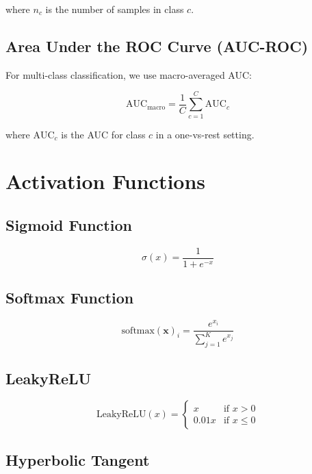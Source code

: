 \documentclass[12pt]{article}
\newcommand{\vecbf}[1]{\mathbf{#1}}
\newcommand{\lrelu}{\text{LeakyReLU}}
\newcommand{\softmax}{\text{softmax}}
\begin{document}
where $n_c$ is the number of samples in class $c$.

\subsection{Area Under the ROC Curve (AUC-ROC)}

For multi-class classification, we use macro-averaged AUC:

\begin{equation}
\text{AUC}_{\text{macro}} = \frac{1}{C} \sum_{c=1}^{C} \text{AUC}_c
\end{equation}

where $\text{AUC}_c$ is the AUC for class $c$ in a one-vs-rest setting.

\section{Activation Functions}

\subsection{Sigmoid Function}

\begin{equation}
\sigma(x) = \frac{1}{1 + e^{-x}}
\end{equation}

\subsection{Softmax Function}

\begin{equation}
\softmax(\vecbf{x})_i = \frac{e^{x_i}}{\sum_{j=1}^{K} e^{x_j}}
\end{equation}

\subsection{LeakyReLU}

\begin{equation}
\lrelu(x) = \begin{cases}
x & \text{if } x > 0 \\
0.01x & \text{if } x \leq 0
\end{cases}
\end{equation}

\subsection{Hyperbolic Tangent}
\end{document}
